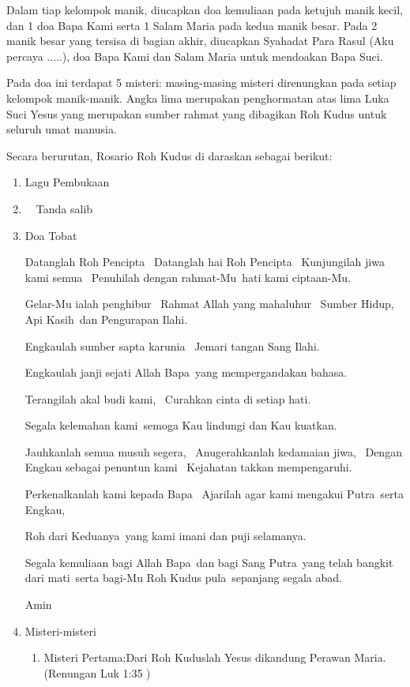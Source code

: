 Dalam tiap kelompok manik, diucapkan doa kemuliaan pada ketujuh manik
kecil, dan 1 doa Bapa Kami serta 1 Salam Maria pada kedua manik besar.
Pada 2 manik besar yang tersisa di bagian akhir, diucapkan Syahadat
Para Rasul (Aku percaya .....), doa Bapa Kami dan Salam Maria untuk
mendoakan Bapa Suci.

Pada doa ini terdapat 5 misteri: masing-masing misteri direnungkan pada
setiap kelompok manik-manik. Angka lima merupakan penghormatan atas
lima Luka Suci Yesus yang merupakan sumber rahmat yang dibagikan Roh
Kudus untuk seluruh umat manusia.

Secara berurutan, Rosario Roh Kudus di daraskan sebagai berikut:
\begin{enumerate}

\item Lagu Pembukaan
\item \Cross ~~Tanda salib
\item Doa Tobat

Datanglah Roh Pencipta~ Datanglah hai Roh Pencipta~ Kunjungilah jiwa
kami semua~ Penuhilah dengan rahmat-Mu~hati kami ciptaan-Mu.

Gelar-Mu ialah penghibur~ Rahmat Allah yang mahaluhur~ Sumber Hidup, Api
Kasih~dan Pengurapan Ilahi.

Engkaulah sumber sapta karunia~ Jemari tangan Sang Ilahi.

Engkaulah janji sejati Allah Bapa~yang mempergandakan bahasa.

Terangilah akal budi kami,~ Curahkan cinta di setiap hati.

Segala kelemahan kami~semoga Kau lindungi dan Kau kuatkan.

Jauhkanlah semua musuh segera,~ Anugerahkanlah kedamaian jiwa,~ Dengan
Engkau sebagai penuntun kami~ Kejahatan tak{\textquotesingle}kan
mempengaruhi.

Perkenalkanlah kami kepada Bapa~ Ajarilah agar kami mengakui Putra~serta
Engkau, 

Roh dari Keduanya~yang kami imani dan puji selamanya.

Segala kemuliaan bagi Allah Bapa~dan bagi Sang Putra~yang telah bangkit
dari mati~serta bagi-Mu Roh Kudus pula~sepanjang segala abad.

Amin
\item Misteri-misteri
\begin{enumerate}
\item  Misteri Pertama:{\textquotedbl}Dari Roh Kuduslah Yesus dikandung Perawan
Maria.{\textquotedbl}~ (Renungan Luk 1:35 )


\end{enumerate}
\end{enumerate}
